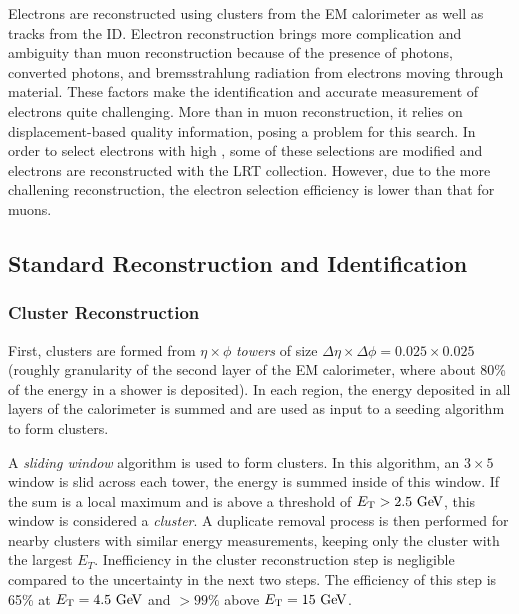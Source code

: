 Electrons are reconstructed using clusters from the \ac{EM} calorimeter as well as tracks from the \ac{ID}. \cite{electron-reco} Electron reconstruction brings more complication and ambiguity than muon reconstruction because of the presence of photons, converted photons, and bremsstrahlung radiation from electrons moving through material. These factors make the identification and accurate measurement of electrons quite challenging. More than in muon reconstruction, it relies on displacement-based quality information, posing a problem for this search. In order to select electrons with high \dz, some of these selections are modified and electrons are reconstructed with the \ac{LRT} collection. However, due to the more challening reconstruction, the electron selection efficiency is lower than that for muons.

\subsection{Standard Reconstruction and Identification}


\subsubsection{Cluster Reconstruction}

First, clusters are formed from $\eta \times \phi$ \emph{towers} of size $\Delta \eta \times \Delta \phi = 0.025 \times 0.025$ (roughly granularity of the second layer of the \ac{EM} calorimeter, where about 80\% of the energy in a shower is deposited). In each region, the energy deposited in all layers of the calorimeter is summed and are used as input to a seeding algorithm to form clusters. 

A \emph{sliding window} algorithm \cite{electron-sliding-window} is used to form clusters. In this algorithm, an $3 \times 5$ window is slid across each tower, the energy is summed inside of this window. If the sum is a local maximum and is above a threshold of $\et > 2.5 \GeV$, this window is considered a \emph{cluster}. A duplicate removal process is then performed for nearby clusters with similar energy measurements, keeping only the cluster with the largest $E_{T}$. Inefficiency in the cluster reconstruction step is negligible compared to the uncertainty in the next two steps. The efficiency of this step is 65\% at $\et = 4.5 \GeV$ and $> 99\%$ above $\et = 15 \GeV$.

